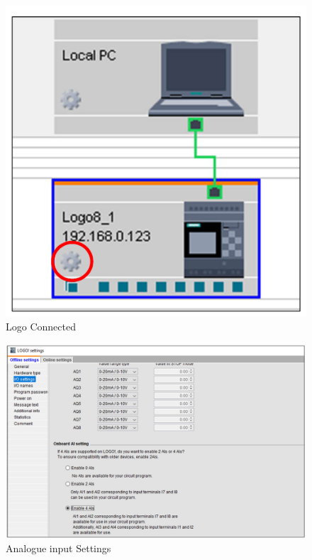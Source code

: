 \documentclass[11pt]{IEEEtran}
\begin{document}
\begin{figure}[H]
	\centering
	\includegraphics[scale=0.7]{ConnectedLogo.pdf}
	\caption{Logo Connected}
	\label{fig:ConnectedLogo}
\end{figure}

\begin{figure}[H]
	\centering
	\includegraphics[scale=0.85]{Settings.pdf}
	\caption{Analogue input Settings}
	\label{fig:Settings}
\end{figure}
\end{document}
